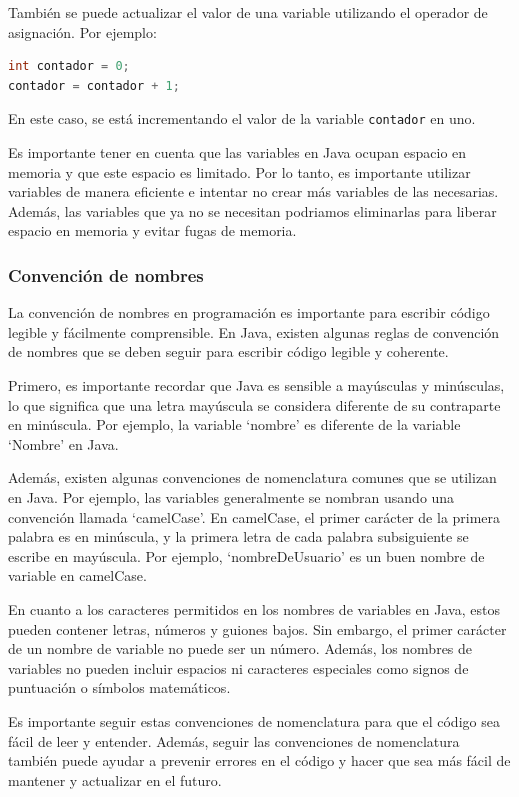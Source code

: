 \documentclass[executivepaper]{article}
\begin{document}
También se puede actualizar el valor de una variable utilizando el operador de asignación. Por ejemplo:

\begin{lstlisting}[language=Java]
int contador = 0;
contador = contador + 1;
\end{lstlisting}
En este caso, se está incrementando el valor de la variable \lstinline{contador} en uno.

Es importante tener en cuenta que las variables en Java ocupan espacio en memoria y que este espacio es limitado. Por lo tanto, es importante utilizar variables de manera eficiente e intentar no crear más variables de las necesarias. Además, las variables que ya no se necesitan podriamos eliminarlas para liberar espacio en memoria y evitar fugas de memoria.

\subsubsection{Convención de nombres}
La convención de nombres en programación es importante para escribir código legible y fácilmente comprensible. En Java, existen algunas reglas de convención de nombres que se deben seguir para escribir código legible y coherente.

Primero, es importante recordar que Java es sensible a mayúsculas y minúsculas, lo que significa que una letra mayúscula se considera diferente de su contraparte en minúscula. Por ejemplo, la variable \enquote*{nombre} es diferente de la variable \enquote*{Nombre} en Java.

Además, existen algunas convenciones de nomenclatura comunes que se utilizan en Java. Por ejemplo, las variables generalmente se nombran usando una convención llamada \enquote*{camelCase}. En camelCase, el primer carácter de la primera palabra es en minúscula, y la primera letra de cada palabra subsiguiente se escribe en mayúscula. Por ejemplo, \enquote*{nombreDeUsuario} es un buen nombre de variable en camelCase.

En cuanto a los caracteres permitidos en los nombres de variables en Java, estos pueden contener letras, números y guiones bajos. Sin embargo, el primer carácter de un nombre de variable no puede ser un número. Además, los nombres de variables no pueden incluir espacios ni caracteres especiales como signos de puntuación o símbolos matemáticos.

Es importante seguir estas convenciones de nomenclatura para que el código sea fácil de leer y entender. Además, seguir las convenciones de nomenclatura también puede ayudar a prevenir errores en el código y hacer que sea más fácil de mantener y actualizar en el futuro.
\end{document}
